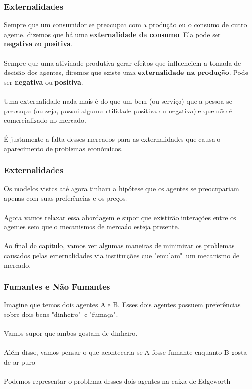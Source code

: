 \documentclass{beamer}[10]
\begin{document}
\begin{frame}
	\frametitle{Externalidades}

	Sempre que um consumidor se preocupar com a produção ou o consumo de outro agente, dizemos que há uma \textbf{externalidade de consumo}. Ela pode ser \textbf{negativa} ou \textbf{positiva}.
	\\~\\
	Sempre que uma atividade produtiva gerar efeitos que influenciem a tomada de decisão dos agentes, diremos que existe uma \textbf{externalidade na produção}. Pode ser \textbf{negativa} ou \textbf{positiva}.
	\\~\\
	Uma externalidade nada mais é do que um bem (ou serviço) que a pessoa se preocupa (ou seja, possui alguma utilidade positiva ou negativa) e que não é comercializado no mercado.
	\\~\\
	É justamente a falta desses mercados para as externalidades que causa o aparecimento de problemas econômicos.

\end{frame}

\begin{frame}
	\frametitle{Externalidades}

	Os modelos vistos até agora tinham a hipótese que os agentes se preocupariam apenas com suas preferências e os preços.
	\\~\\
	Agora vamos relaxar essa abordagem e supor que existirão interações entre os agentes sem que o mecanismos de mercado esteja presente.
	\\~\\
	Ao final do capítulo, vamos ver algumas maneiras de minimizar os problemas causados pelas externalidades via instituições que "emulam"\ um mecanismo de mercado.

\end{frame}

\begin{frame}
	\frametitle{Fumantes e Não Fumantes}

	Imagine que temos dois agentes A e B. Esses dois agentes possuem preferências sobre dois bens "dinheiro"\ e "fumaça".
	\\~\\
	Vamos supor que ambos gostam de dinheiro.
	\\~\\
	Além disso, vamos pensar o que aconteceria se A fosse fumante enquanto B gosta de ar puro.
	\\~\\
	Podemos representar o problema desses dois agentes na caixa de Edgeworth

\end{frame}
\end{document}

